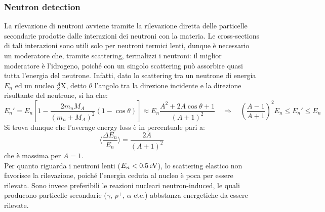 \subsubsection{Neutron detection}

La rilevazione di neutroni avviene tramite la rilevazione diretta delle particelle secondarie prodotte dalle interazioni dei neutroni con la materia. Le cross-sections di tali interazioni sono utili solo per neutroni termici lenti, dunque è necessario un moderatore che, tramite scattering, termalizzi i neutroni: il miglior moderatore è l'idrogeno, poiché con un singolo scattering può assorbire quasi tutta l'energia del neutrone. Infatti, dato lo scattering tra un neutrone di energia $ E_n $ ed un nucleo $ ^A_Z\text{X} $, detto $ \theta $ l'angolo tra la direzione incidente e la direzione risultante del neutrone, si ha che:
\begin{equation*}
	E_n' = E_n \left[ 1 - \frac{2 m_n M_A}{(m_n + M_A)^2} (1 - \cos \theta) \right] \approx E_n \frac{A^2 + 2A \cos \theta + 1}{(A + 1)^2} \quad\Rightarrow\quad \left( \frac{A - 1}{A + 1} \right)^2 E_n \le E_n' \le E_n
\end{equation*}
Si trova dunque che l'average energy loss è in percentuale pari a:
\begin{equation}
	\bigg\langle \frac{\Delta E_n}{E_n} \bigg\rangle = \frac{2A}{(A + 1)^2}
	\label{eq:3.13}
\end{equation}
che è massima per $ A = 1 $.\\
Per quanto riguarda i neutroni lenti ($ E_n < 0.5 \,\mathrm{eV} $), lo scattering elastico non favorisce la rilevazione, poiché l'energia ceduta al nucleo è poca per essere rilevata. Sono invece preferibili le reazioni nucleari neutron-induced, le quali producono particelle secondarie ($ \gamma $, $ p^+ $, $ \alpha $ etc.) abbstanza energetiche da essere rilevate.










